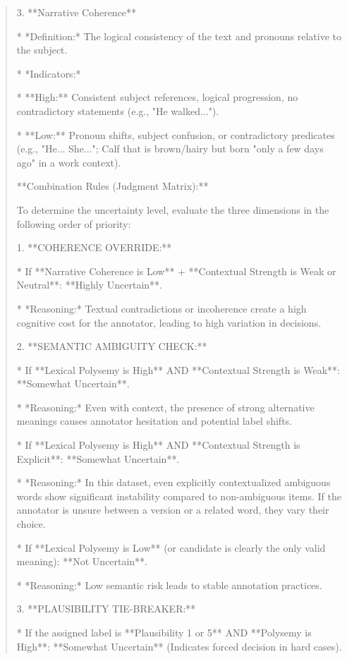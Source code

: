 \begin{quote}
3.  **Narrative Coherence**

    *   *Definition:* The logical consistency of the text and pronouns relative to the subject.

    *   *Indicators:*

        *   **High:** Consistent subject references, logical progression, no contradictory statements (e.g., "He walked...").

        *   **Low:** Pronoun shifts, subject confusion, or contradictory predicates (e.g., "He... She..."; Calf that is brown/hairy but born "only a few days ago" in a work context).



**Combination Rules (Judgment Matrix):**



To determine the uncertainty level, evaluate the three dimensions in the following order of priority:



1.  **COHERENCE OVERRIDE:**

    *   If **Narrative Coherence is Low** + **Contextual Strength is Weak or Neutral**: **Highly Uncertain**.

    *   *Reasoning:* Textual contradictions or incoherence create a high cognitive cost for the annotator, leading to high variation in decisions.

2.  **SEMANTIC AMBIGUITY CHECK:**

    *   If **Lexical Polysemy is High** AND **Contextual Strength is Weak**: **Somewhat Uncertain**.

    *   *Reasoning:* Even with context, the presence of strong alternative meanings causes annotator hesitation and potential label shifts.

    *   If **Lexical Polysemy is High** AND **Contextual Strength is Explicit**: **Somewhat Uncertain**.

    *   *Reasoning:* In this dataset, even explicitly contextualized ambiguous words show significant instability compared to non-ambiguous items. If the annotator is unsure between a version or a related word, they vary their choice.

    *   If **Lexical Polysemy is Low** (or candidate is clearly the only valid meaning): **Not Uncertain**.

    *   *Reasoning:* Low semantic risk leads to stable annotation practices.

3.  **PLAUSIBILITY TIE-BREAKER:**

    *   If the assigned label is **Plausibility 1 or 5** AND **Polysemy is High**: **Somewhat Uncertain** (Indicates forced decision in hard cases).


\end{quote}
